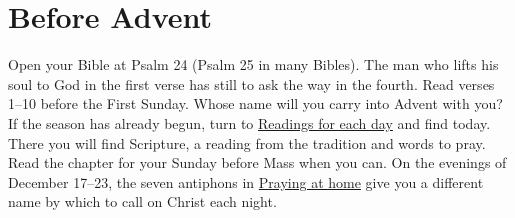 \section*{Before Advent}

Open your Bible at Psalm 24 (Psalm 25 in many Bibles). The man who lifts
his soul to God in the first verse has still to ask the way in the fourth.
Read verses 1--10 before the First Sunday. Whose name will you carry into
Advent with you? If the season has already begun, turn to \hyperref[sec:advent-daily-readings]{Readings
for each day} and find today. There you will find Scripture, a reading
from the tradition and words to pray. Read the chapter for your Sunday
before Mass when you can. On the evenings of December 17--23, the seven
antiphons in \hyperref[sec:advent-home-prayers]{Praying at home} give you a different name by which
to call on Christ each night.
